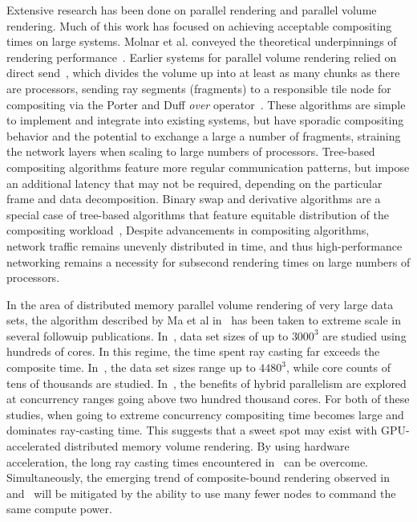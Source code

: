 Extensive research has been done on parallel rendering and parallel
volume rendering.  Much of this work has focused on achieving
acceptable compositing times on large systems.  Molnar et al. conveyed
the theoretical underpinnings of rendering
performance~\cite{Molnar:199?:???}.  Earlier systems for parallel
volume rendering relied on direct send~\cite{Hsu:1993:???,
Ma:1993:???}, which divides the volume up into at least as many
chunks as there are processors, sending ray segments (fragments) to a
responsible tile node for compositing via the Porter and Duff
\emph{over} operator~\cite{PorterDuff:1984:Compositing}.  These
algorithms are simple to implement and integrate into existing systems,
but have sporadic compositing behavior and the potential to exchange a
large a number of fragments, straining the network layers when scaling
to large numbers of processors.  Tree-based compositing algorithms
feature more regular communication patterns, but impose an additional
latency that may not be required, depending on the particular frame
and data decomposition.  Binary swap and derivative algorithms are a
special case of tree-based algorithms that feature
equitable distribution of the compositing
workload~\cite{Ma:1994:BinarySwap}, Despite advancements in compositing
algorithms, network traffic remains unevenly distributed in time, and
thus high-performance networking remains a necessity for subsecond
rendering times on large numbers of processors.

In the area of distributed memory parallel volume rendering of very
large data sets, the algorithm described by Ma et al
in~\cite{Ma:1993:???} has been taken to extreme scale in several
followuip publications.  In~\cite{Childs:2006:???}, data set sizes of
up to $3000^3$ are studied using hundreds of cores.  In this regime,
the time spent ray casting far exceeds the composite time.
In~\cite{PYRM:2008:???, PYR:2009:???}, the data set sizes range up to
$4480^3$, while core counts of tens of thousands are studied.
In~\cite{HBC:2010:???}, the benefits of hybrid parallelism are explored
at concurrency ranges going above two hundred thousand cores.  For both
of these studies, when going to extreme concurrency compositing time
becomes large and dominates ray-casting time.  This suggests that a
sweet spot may exist with GPU-accelerated distributed memory volume
rendering.  By using hardware acceleration, the long ray
casting times encountered in~\cite{Childs:2006:???} can be overcome.
Simultaneously, the emerging trend of composite-bound rendering
observed in~\cite{PYR:2009:???} and~\cite{HBC:2010:???} will be
mitigated by the ability to use many fewer nodes to command the same
compute power.

